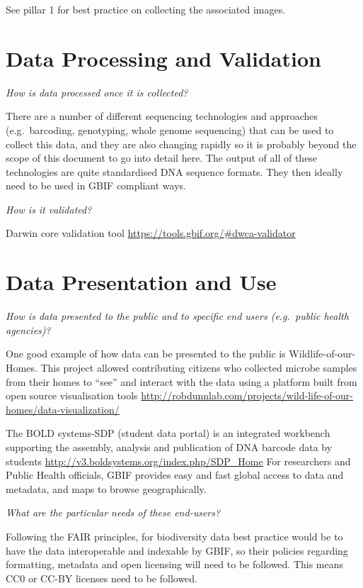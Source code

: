 \documentclass[]{article}
\begin{document}
See pillar 1 for best practice on collecting the associated images.

\hypertarget{data-processing-and-validation}{%
\section{Data Processing and Validation}\label{data-processing-and-validation}}

\emph{How is data processed once it is collected?}

There are a number of different sequencing technologies and approaches (e.g.~barcoding, genotyping, whole genome sequencing) that can be used to collect this data, and they are also changing rapidly so it is probably beyond the scope of this document to go into detail here. The output of all of these technologies are quite standardised DNA sequence formats. They then ideally need to be used in GBIF compliant ways.

\emph{How is it validated?}

Darwin core validation tool \url{https://tools.gbif.org/\#dwca-validator}

\hypertarget{data-presentation-and-use}{%
\section{Data Presentation and Use}\label{data-presentation-and-use}}

\emph{How is data presented to the public and to specific end users (e.g.~public health agencies)?}

One good example of how data can be presented to the public is Wildlife-of-our-Homes. This project allowed contributing citizens who collected microbe samples from their homes to ``see'' and interact with the data using a platform built from open source visualisation tools \url{http://robdunnlab.com/projects/wild-life-of-our-homes/data-visualization/}

The BOLD systems-SDP (student data portal) is an integrated workbench supporting the assembly, analysis and publication of DNA barcode data by students \url{http://v3.boldsystems.org/index.php/SDP_Home}
For researchers and Public Health officials, GBIF provides easy and fast global access to data and metadata, and maps to browse geographically.

\emph{What are the particular needs of these end-users?}

Following the FAIR principles, for biodiversity data best practice would be to have the data interoperable and indexable by GBIF, so their policies regarding formatting, metadata and open licensing will need to be followed. This means CC0 or CC-BY licenses need to be followed.
\end{document}
